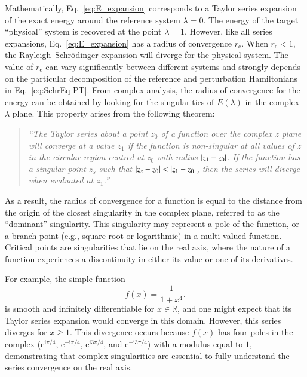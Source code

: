 \documentclass[aps,prb,reprint,noshowkeys,superscriptaddress]{revtex4-1}
\newcommand{\hugh}[1]{\textcolor{hughgreen}{#1}}
\newcommand{\latin}[1]{#1}
\newcommand{\eg}{\latin{e.g.}}
\renewcommand{\i}{\mathrm{i}} %
\newcommand{\e}{\mathrm{e}} %
\newcommand{\rc}{r_{\text{c}}}
\begin{document}
Mathematically, Eq.~\eqref{eq:E_expansion} corresponds to a Taylor series expansion of the exact energy
around the reference system $\lambda = 0$.
The energy of the target ``physical'' system is recovered at the point $\lambda = 1$.
However, like all series expansions, Eq.~\eqref{eq:E_expansion} has a radius of convergence $\rc$. 
When $\rc < 1$, the Rayleigh--Schr\"{o}dinger expansion will diverge
for the physical system.
The value of $\rc$ can vary significantly between different systems and strongly depends on the particular decomposition
of the reference and perturbation Hamiltonians in Eq.~\eqref{eq:SchrEq-PT}.\cite{Mihalka_2017b}
%
From complex-analysis, \cite{BenderBook} the radius of convergence for the energy can be obtained by looking for the 
singularities of $E(\lambda)$ in the complex $\lambda$ plane.
This property arises from the following theorem: \cite{Goodson_2011}
\begin{quote}
\it
``The Taylor series about a point $z_0$ of a function over the complex $z$ plane will converge at a value $z_1$ 
if the function is non-singular at all values of $z$ in the circular region centred at $z_0$ with radius $\abs{z_1-z_0}$. 
If the function has a singular point $z_s$ such that $\abs{z_s-z_0} < \abs{z_1-z_0}$, 
then the series will diverge when evaluated at $z_1$.''
\end{quote}
As a result, the radius of convergence for a function is equal to the distance from the origin of the closest singularity
in the complex plane, \hugh{referred to as the ``dominant'' singularity.
This singularity may represent a pole of the function, or a branch point (\eg, square-root or logarithmic)
in a multi-valued function.
Critical points are singularities that lie on the real axis, where the nature of a function experiences
a discontinuity in either its value or one of its derivatives.}

For example, the simple function
\begin{equation} \label{eq:DivExample}
	f(x)=\frac{1}{1+x^4}.
\end{equation}
is smooth and infinitely differentiable for $x \in \mathbb{R}$, and one might expect that its Taylor series expansion would 
converge in this domain.
However, this series diverges for $x \ge 1$.
This divergence occurs because $f(x)$ has four \hugh{poles} in the complex 
($\e^{\i\pi/4}$, $\e^{-\i\pi/4}$, $\e^{\i3\pi/4}$, and $\e^{-\i3\pi/4}$) with a modulus equal to $1$, demonstrating
that complex singularities are essential to fully understand the series convergence on the real axis.\cite{BenderBook}
\end{document}
